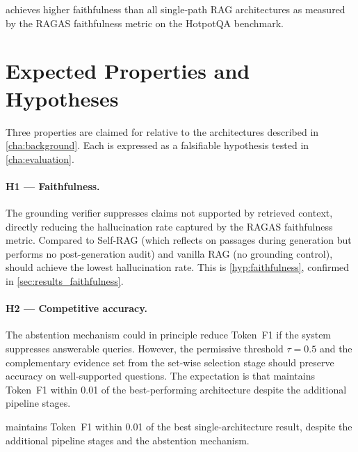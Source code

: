 \begin{hypothesis}[Faithfulness]
  \label{hyp:faithfulness}
  \rarerag{} achieves higher faithfulness than all single-path RAG architectures
  as measured by the RAGAS faithfulness metric on the HotpotQA benchmark.
\end{hypothesis}

\section{Expected Properties and Hypotheses}
\label{sec:rarerag_hypotheses}

Three properties are claimed for \rarerag{} relative to the architectures
described in \cref{cha:background}.
Each is expressed as a falsifiable hypothesis tested in \cref{cha:evaluation}.

\paragraph{H1 --- Faithfulness.}
The grounding verifier suppresses claims not supported by retrieved context,
directly reducing the hallucination rate captured by the RAGAS faithfulness metric.
Compared to Self-RAG (which reflects on passages during generation but
performs no post-generation audit) and vanilla RAG (no grounding control),
\rarerag{} should achieve the lowest hallucination rate.
This is \cref{hyp:faithfulness}, confirmed in \cref{sec:results_faithfulness}.

\paragraph{H2 --- Competitive accuracy.}
The abstention mechanism could in principle reduce Token~F1 if the system
suppresses answerable queries.
However, the permissive threshold $\tau = 0.5$ and the complementary evidence
set from the set-wise selection stage should preserve accuracy on
well-supported questions.
The expectation is that \rarerag{} maintains Token~F1 within 0.01 of the
best-performing architecture despite the additional pipeline stages.

\begin{hypothesis}
  \label{hyp:accuracy}
  \rarerag{} maintains Token~F1 within 0.01 of the best single-architecture
  result, despite the additional pipeline stages and the abstention mechanism.
\end{hypothesis}

